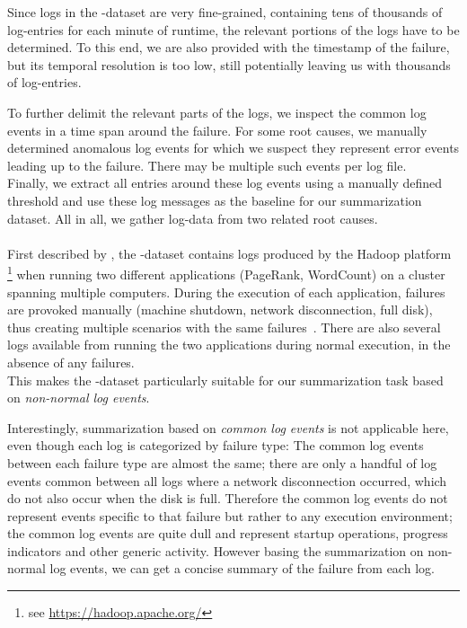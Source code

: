 Since logs in the \telco{}-dataset are very fine-grained,
containing tens of thousands of log-entries for each minute of runtime,
the relevant portions of the logs have to be determined.
To this end, we are also provided with the timestamp of the failure,
but its temporal resolution is too low,
still potentially leaving us with thousands of log-entries.

To further delimit the relevant parts of the logs, we inspect the common log events in a time span around the failure.
For some root causes, we manually determined anomalous log events for which we suspect they represent error events leading up to the failure.
There may be multiple such events per log file.\\
Finally, we extract all entries around these log events using a manually defined
threshold and use these log messages as the baseline for our summarization dataset.
All in all, we gather log-data from two related root causes.

\paragraph{\hadoop{}}

First described by \citeauthor*{hadoop_dataset},
the \hadoop{}-dataset contains logs produced by the Hadoop platform%
\footnote{see \url{https://hadoop.apache.org/}} when running two different applications (PageRank, WordCount) on a cluster spanning multiple computers.
During the execution of each application, failures are provoked manually (machine shutdown, network disconnection, full disk),
thus creating multiple scenarios with the same failures~\parencite[106]{hadoop_dataset}.
There are also several logs available from running the two applications during normal execution, in the absence of any failures.\\
This makes the \hadoop{}-dataset particularly suitable for our summarization task based on \emph{non-normal log events}.

Interestingly, summarization based on \emph{common log events} is not applicable here, even though each log is categorized by failure type:
The common log events between each failure type are almost the same;
there are only a handful of log events common between all logs where a network disconnection occurred,
which do not also occur when the disk is full.
Therefore the common log events do not represent events specific to that failure
but rather to any execution environment;
the common log events are quite dull and represent startup operations, progress indicators and other generic activity.
However basing the summarization on non-normal log events, we can get a concise summary of the failure from each log.

